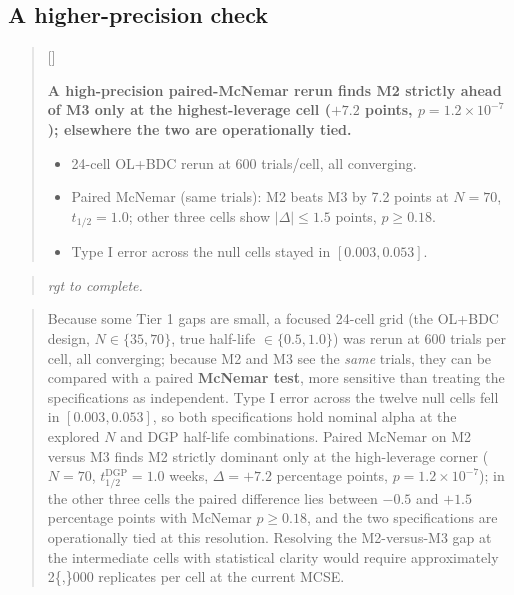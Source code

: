 \documentclass[
  11pt,
]{article}
\newcounter{pgraph}
\newenvironment{bullets}{%
  \stepcounter{pgraph}%
  \begin{quote}\small\sffamily\color[gray]{0.30}%
  {\normalfont\scriptsize\color[gray]{0.58}[\thepgraph]\enspace}}{%
  \end{quote}}
\newenvironment{rgt}{%
  \begin{quote}\small\itshape\color[RGB]{20,60,160}}{%
  \end{quote}}
\newenvironment{orig}{%
  \begin{quote}\normalsize\color[gray]{0.55}}{%
  \end{quote}}
\begin{document}
\subsection{A higher-precision check}\label{a-higher-precision-check}

\begin{bullets}

\textbf{A high-precision paired-McNemar rerun finds M2 strictly ahead
of M3 only at the highest-leverage cell ($+7.2$ points,
$p = 1.2 \times 10^{-7}$); elsewhere the two are operationally tied.}

\begin{itemize}\setlength{\itemsep}{2pt}\setlength{\parskip}{0pt}
\item 24-cell OL+BDC rerun at 600 trials/cell, all converging.
\item Paired McNemar (same trials): M2 beats M3 by 7.2 points at
$N = 70$, $t_{1/2} = 1.0$; other three cells show
$|\Delta| \leq 1.5$ points, $p \geq 0.18$.
\item Type I error across the null cells stayed in $[0.003, 0.053]$.
\end{itemize}

\end{bullets}

\begin{rgt}
rgt to complete.

\end{rgt}

\begin{orig}
Because some Tier 1 gaps are small, a focused 24-cell grid (the
OL+BDC design, \(N \in \{35, 70\}\), true half-life
\(\in \{0.5, 1.0\}\)) was rerun at 600 trials per cell, all converging;
because M2 and M3 see the \emph{same} trials, they can be compared with a
paired \textbf{McNemar test}, more sensitive than treating the
specifications as independent. Type I error across the twelve null
cells fell in \([0.003, 0.053]\), so both specifications hold nominal
alpha at the explored \(N\) and DGP half-life combinations. Paired
McNemar on M2 versus M3 finds M2 strictly dominant only at the
high-leverage corner (\(N = 70\), \(t_{1/2}^{\text{DGP}} = 1.0\) weeks,
\(\Delta = +7.2\) percentage points, \(p = 1.2 \times 10^{-7}\)); in the
other three cells the paired difference lies between \(-0.5\) and
\(+1.5\) percentage points with McNemar \(p \geq 0.18\), and the two
specifications are operationally tied at this resolution. Resolving
the M2-versus-M3 gap at the intermediate cells with statistical
clarity would require approximately 2\{,\}000 replicates per cell at
the current MCSE.

\end{orig}
\end{document}
